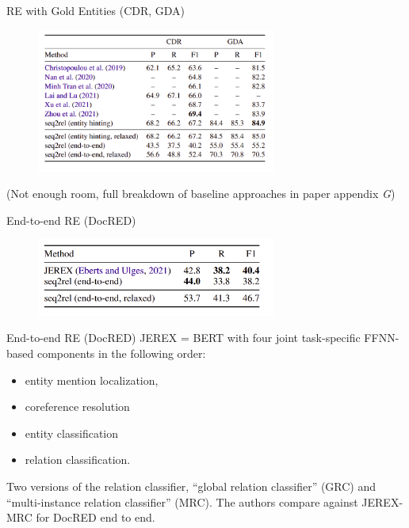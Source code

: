 \documentclass[usenames,dvipsnames,pdf]{beamer}
\begin{document}
        \begin{frame}{RE with Gold Entities (CDR, GDA)}
          \begin{figure}
            \includegraphics[width=0.7\textwidth,height=0.7\textheight,keepaspectratio]{CDR_GDA_gold_entities} 
          \end{figure}

          (Not enough room, full breakdown of baseline approaches in paper appendix {\it G})
        \end{frame}

        \begin{frame}{End-to-end RE (DocRED)}
          \begin{figure}
            \includegraphics[width=0.7\textwidth,height=0.7\textheight,keepaspectratio]{DocRED_e2e_comparison} 
          \end{figure}
        \end{frame}

        \begin{frame}{End-to-end RE (DocRED)}          
          JEREX =  BERT with four joint task-specific
          FFNN-based components in the following order:
          \begin{itemize}
          \item
            entity mention localization,
          \item
            coreference
            resolution
          \item
            entity classification
          \item relation
            classification.
          \end{itemize}
          Two versions of
          the relation classifier, “global relation classifier” (GRC) and “multi-instance
          relation classifier” (MRC). The authors compare against
          JEREX-MRC for DocRED end to end.

        \end{frame}
\end{document}

